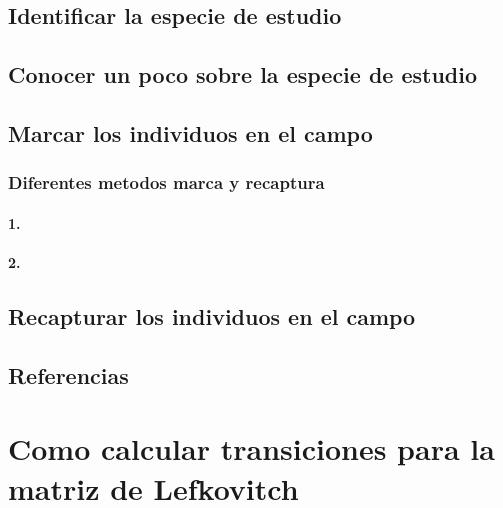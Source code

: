 \documentclass[
]{book}
\theoremstyle{definition}
\theoremstyle{definition}
\theoremstyle{definition}
\theoremstyle{definition}
\theoremstyle{remark}
\begin{document}
\hypertarget{identificar-la-especie-de-estudio}{%
\section{Identificar la especie de estudio}\label{identificar-la-especie-de-estudio}}

\hypertarget{conocer-un-poco-sobre-la-especie-de-estudio}{%
\section{Conocer un poco sobre la especie de estudio}\label{conocer-un-poco-sobre-la-especie-de-estudio}}

\hypertarget{marcar-los-individuos-en-el-campo}{%
\section{Marcar los individuos en el campo}\label{marcar-los-individuos-en-el-campo}}

\hypertarget{diferentes-metodos-marca-y-recaptura}{%
\subsection{Diferentes metodos marca y recaptura}\label{diferentes-metodos-marca-y-recaptura}}

\hypertarget{section}{%
\subsubsection{1.}\label{section}}

\hypertarget{section-1}{%
\subsubsection{2.}\label{section-1}}

\hypertarget{recapturar-los-individuos-en-el-campo}{%
\section{Recapturar los individuos en el campo}\label{recapturar-los-individuos-en-el-campo}}

\hypertarget{referencias-2}{%
\section{Referencias}\label{referencias-2}}

\hypertarget{como-calcular-transiciones-para-la-matriz-de-lefkovitch}{%
\chapter{Como calcular transiciones para la matriz de Lefkovitch}\label{como-calcular-transiciones-para-la-matriz-de-lefkovitch}}
\end{document}

